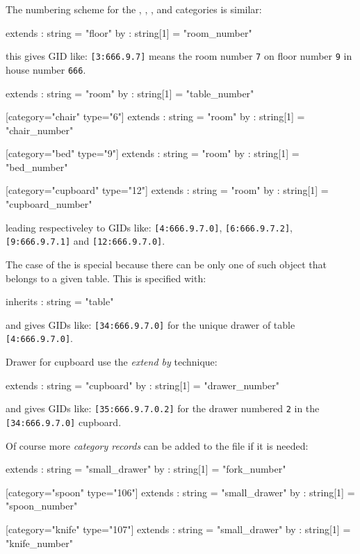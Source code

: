 The numbering scheme for the , , ,  
and   categories is similar:
\begin{ShellVerbatim}
[category="room" type="3"]
extends : string    = "floor"
by      : string[1] = "room_number"
\end{ShellVerbatim}
this gives GID like:  \verb+[3:666.9.7]+ means the room number \texttt{7}
on floor number \texttt{9} 
in house number \texttt{666}.

\begin{ShellVerbatim}
[category="table" type="4"]
extends : string    = "room"
by      : string[1] = "table_number"

[category="chair" type="6"]
extends : string    = "room"
by      : string[1] = "chair_number"

[category="bed" type="9"]
extends : string    = "room"
by      : string[1] = "bed_number"

[category="cupboard" type="12"]
extends : string    = "room"
by      : string[1] = "cupboard_number"
\end{ShellVerbatim}
leading respectiveley to GIDs like:
\verb+[4:666.9.7.0]+,
\verb+[6:666.9.7.2]+,
\verb+[9:666.9.7.1]+ and \verb+[12:666.9.7.0]+.

The case of the  is special because
there can be only one of such object that belongs to a given table.
This is specified with:
\begin{ShellVerbatim}
[category="small_drawer" type="34"]
inherits : string    = "table"
\end{ShellVerbatim}
and gives GIDs like: \verb+[34:666.9.7.0]+ for the unique
drawer of table \verb+[4:666.9.7.0]+.

Drawer for cupboard use the \emph{extend by} technique:
\begin{ShellVerbatim}
[category="large_drawer" type="35"]
extends : string    = "cupboard"
by      : string[1] = "drawer_number"
\end{ShellVerbatim}
and gives GIDs like: \verb+[35:666.9.7.0.2]+ for the
drawer numbered \texttt{2} in the \verb+[34:666.9.7.0]+ cupboard.

Of course more \emph{category records} can be added to the file
if it is needed:
\begin{ShellVerbatim}
[category="fork" type="105"]
extends : string    = "small_drawer"
by      : string[1] = "fork_number"

[category="spoon" type="106"]
extends : string    = "small_drawer"
by      : string[1] = "spoon_number"

[category="knife" type="107"]
extends : string    = "small_drawer"
by      : string[1] = "knife_number"
\end{ShellVerbatim}


